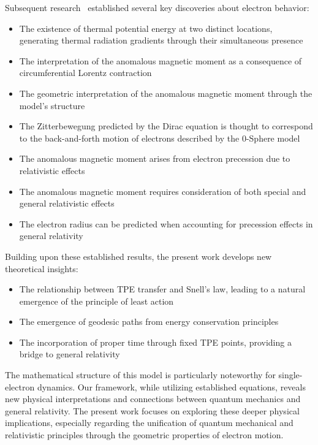 \documentclass[%
 reprint,
 amsmath,amssymb,
 aps,
]{revtex4-1}
\numberwithin{equation}{section}%
\begin{document}
Subsequent research~\cite{hanamura2018, hanamura2020, hanamura2023} established several key discoveries about electron behavior:
\begin{itemize}
    \item The existence of thermal potential energy at two distinct locations, generating thermal radiation gradients through their simultaneous presence
    \item The interpretation of the anomalous magnetic moment as a consequence of circumferential Lorentz contraction
    \item The geometric interpretation of the anomalous magnetic moment through the model's structure
    \item The Zitterbewegung predicted by the Dirac equation is thought to correspond to the back-and-forth motion of electrons described by the 0-Sphere model
    \item The anomalous magnetic moment arises from electron precession due to relativistic effects
    \item The anomalous magnetic moment requires consideration of both special and general relativistic effects
    \item The electron radius can be predicted when accounting for precession effects in general relativity
\end{itemize}

Building upon these established results, the present work develops new theoretical insights:
\begin{itemize}
    \item The relationship between TPE transfer and Snell's law, leading to a natural emergence of the principle of least action
    \item The emergence of geodesic paths from energy conservation principles
    \item The incorporation of proper time through fixed TPE points, providing a bridge to general relativity
\end{itemize}

The mathematical structure of this model is particularly noteworthy for single-electron dynamics. Our framework, while utilizing established equations, reveals new physical interpretations and connections between quantum mechanics and general relativity. The present work focuses on exploring these deeper physical implications, especially regarding the unification of quantum mechanical and relativistic principles through the geometric properties of electron motion.
\end{document}
